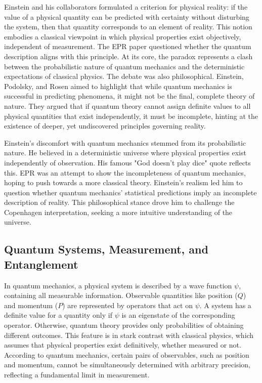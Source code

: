 \documentclass[14pt,a4paper]{extarticle}
\begin{document}
Einstein and his collaborators formulated a criterion for physical reality: if the value of a physical quantity can be predicted with certainty without disturbing the system, then that quantity corresponds to an element of reality. This notion embodies a classical viewpoint in which physical properties exist objectively, independent of measurement. The EPR paper questioned whether the quantum description aligns with this principle. At its core, the paradox represents a clash between the probabilistic nature of quantum mechanics and the deterministic expectations of classical physics. The debate was also philosophical. Einstein, Podolsky, and Rosen aimed to highlight that while quantum mechanics is successful in predicting phenomena, it might not be the final, complete theory of nature. They argued that if quantum theory cannot assign definite values to all physical quantities that exist independently, it must be incomplete, hinting at the existence of deeper, yet undiscovered principles governing reality.

Einstein's discomfort with quantum mechanics stemmed from its probabilistic nature. He believed in a deterministic universe where physical properties exist independently of observation. His famous "God doesn't play dice" quote reflects this. EPR was an attempt to show the incompleteness of quantum mechanics, hoping to push towards a more classical theory. Einstein's realism led him to question whether quantum mechanics' statistical predictions imply an incomplete description of reality. This philosophical stance drove him to challenge the Copenhagen interpretation, seeking a more intuitive understanding of the universe.
\subsection{Quantum Systems, Measurement, and Entanglement}
In quantum mechanics, a physical system is described by a wave function $\psi$, containing all measurable information. Observable quantities like position ($Q$) and momentum ($P$) are represented by operators that act on $\psi$. A system has a definite value for a quantity only if $\psi$ is an eigenstate of the corresponding operator. Otherwise, quantum theory provides only probabilities of obtaining different outcomes. This feature is in stark contrast with classical physics, which assumes that physical properties exist definitively, whether measured or not. According to quantum mechanics, certain pairs of observables, such as position and momentum, cannot be simultaneously determined with arbitrary precision, reflecting a fundamental limit in measurement.
\end{document}
